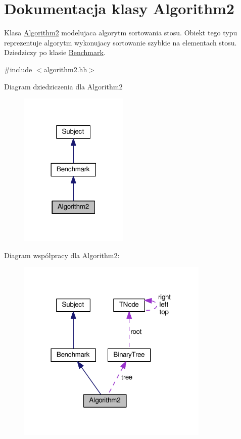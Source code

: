 \hypertarget{class_algorithm2}{\section{Dokumentacja klasy Algorithm2}
\label{class_algorithm2}
}


Klasa \hyperlink{class_algorithm2}{Algorithm2} modelujaca algorytm sortowania stosu. Obiekt tego typu reprezentuje algorytm wykonujacy sortowanie szybkie na elementach stosu. Dziedziczy po klasie \hyperlink{class_benchmark}{Benchmark}.  




{\ttfamily \#include $<$algorithm2.\-hh$>$}



Diagram dziedziczenia dla Algorithm2
\nopagebreak
\begin{figure}[H]
\begin{center}
\leavevmode
\includegraphics[width=146pt]{class_algorithm2__inherit__graph}
\end{center}
\end{figure}


Diagram współpracy dla Algorithm2\-:
\nopagebreak
\begin{figure}[H]
\begin{center}
\leavevmode
\includegraphics[width=259pt]{class_algorithm2__coll__graph}
\end{center}
\end{figure}
